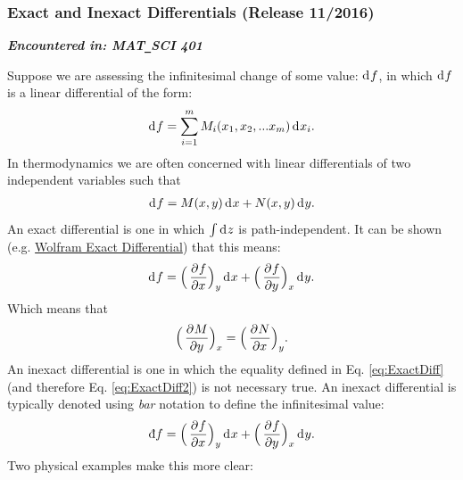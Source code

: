 	\subsubsection{Exact and Inexact Differentials \hfill(Release 11/2016)} \label{subsec:eidiff}
	
	\textit{\textbf{Encountered in: MAT\texttt{\_}SCI 401}} 
	
Suppose we are assessing the infinitesimal change of some value: $\mathop{}\!\mathrm{d^{}}{f}$, in which $\mathop{}\!\mathrm{d^{}}{f}$ is a linear differential of the form:
%
\begin{align}
	\mathop{}\!\mathrm{d^{}}{f} = \sum\limits_{i=1}^m M_i(x_1,x_2,...x_m)\mathop{}\!\mathrm{d^{}}{x_i}.
\end{align}
%	
In thermodynamics we are often concerned with linear differentials of two independent variables such that 
%
\begin{align} \label{eq:LinearDiff}
	\mathop{}\!\mathrm{d^{}}{f} = M(x,y) \mathop{}\!\mathrm{d^{}}{x} + N(x,y) \mathop{}\!\mathrm{d^{}}{y}.
\end{align}
%
An exact differential is one in which $\int{\mathop{}\!\mathrm{d^{}}{z}}$ is path-independent. It can be shown (e.g. \href{http://mathworld.wolfram.com/ExactDifferential.html}{Wolfram Exact Differential}) that this means:
%
\begin{align} \label{eq:ExactDiff}
	\mathop{}\!\mathrm{d^{}}{f} = \Big(\mathop{}\!\frac{\partial^{}{f}}{\partial{x}^{}}\Big)_{y} \mathop{}\!\mathrm{d^{}}{x} + \Big(\mathop{}\!\frac{\partial^{}{f}}{\partial{y}^{}}\Big)_{x} \mathop{}\!\mathrm{d^{}}{y}.
\end{align}
%
Which means that
%
\begin{align} \label{eq:ExactDiff2}
 \Big(\Partial{}{M}{y}\Big)_{x} = \Big(\Partial{}{N}{x}\Big)_{y}. %
\end{align}
%
An inexact differential is one in which the equality defined in Eq. \ref{eq:ExactDiff} (and therefore Eq. \ref{eq:ExactDiff2}) is not necessary true. An inexact differential is typically denoted using \textit{bar} notation to define the infinitesimal value:
%
\begin{align}
	\text{\dj} f = \Big(\Partial{}{f}{x}\Big)_{y} \Diff{}{x} + \Big(\Partial{}{f}{y}\Big)_{x} \Diff{}{y}.
\end{align}
%
Two physical examples make this more clear:  %


